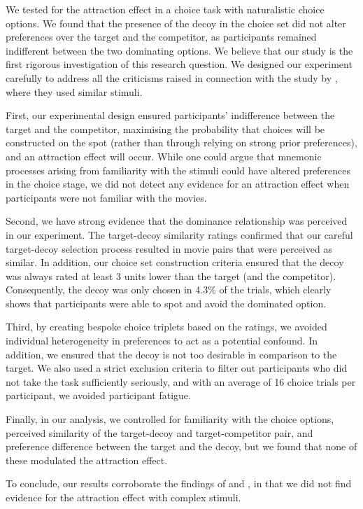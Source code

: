 \documentclass[12pt, a4paper]{article}
\begin{document}
We tested for the attraction effect in a choice task with naturalistic choice options. We found that the presence of the decoy in the choice set did not alter preferences over the target and the competitor, as participants remained indifferent between the two dominating options. We believe that our study is the first rigorous investigation of this research question. We designed our experiment carefully to address all the criticisms raised in connection with the study by \citeauthor{Frederick2014}, where they used similar stimuli.

First, our experimental design ensured participants' indifference between the target and the competitor, maximising the probability that choices will be constructed on the spot (rather than through relying on strong prior preferences), and an attraction effect will occur. While one could argue that mnemonic processes arising from familiarity with the stimuli could have altered preferences in the choice stage, we did not detect any evidence for an attraction effect when participants were not familiar with the movies.

Second, we have strong evidence that the dominance relationship was perceived in our experiment. The target-decoy similarity ratings confirmed that our careful target-decoy selection process resulted in movie pairs that were perceived as similar. In addition, our choice set construction criteria ensured that the decoy was always rated at least 3 units lower than the target (and the competitor). Consequently, the decoy was only chosen in 4.3\% of the trials, which clearly shows that participants were able to spot and avoid the dominated option.

Third, by creating bespoke choice triplets based on the ratings, we avoided individual heterogeneity in preferences to act as a potential confound. In addition, we ensured that the decoy is not too desirable in comparison to the target. We also used a strict exclusion criteria to filter out participants who did not take the task sufficiently seriously, and with an average of 16 choice trials per participant, we avoided participant fatigue.


Finally, in our analysis, we controlled for familiarity with the choice options, perceived similarity of the target-decoy and target-competitor pair, and preference difference between the target and the decoy, but we found that none of these modulated the attraction effect.


To conclude, our results corroborate the findings of \citeauthor{Frederick2014} and \citeauthor{Yang2014}, in that we did not find evidence for the attraction effect with complex stimuli.





\newpage



\newpage

\theendnotes

\newpage
\end{document}
